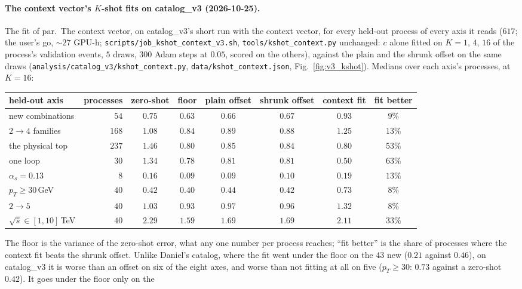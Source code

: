 \documentclass[11pt]{article}
\newcommand{\code}[1]{\texttt{#1}}
\begin{document}
\paragraph{The context vector's $K$-shot fits on catalog\_v3 (2026-10-25).} The fit of par.\ The context vector, on
catalog\_v3's short run with the context vector, for every held-out process of every axis it reads ($617$; the user's go,
$\sim27$ GPU-h; \code{scripts/job\_kshot\_context\_v3.sh}, \code{tools/kshot\_context.py} unchanged: $c$ alone fitted on
$K=1$, $4$, $16$ of the process's validation events, $5$ draws, $300$ Adam steps at $0.05$, scored on the others),
against the plain and the shrunk offset on the same draws (\code{analysis/catalog\_v3/kshot\_context.py},
\code{data/kshot\_context.json}, Fig.~\ref{fig:v3_kshot}). Medians over each axis's processes, at $K=16$:
\begin{center}
\small
\begin{tabular}{lrcccccc}
\hline
held-out axis & processes & zero-shot & floor & plain offset & shrunk offset & context fit & fit better \\
\hline
new combinations & $54$ & $0.75$ & $0.63$ & $0.66$ & $0.67$ & $0.93$ & $9\%$ \\
$2\to4$ families & $168$ & $1.08$ & $0.84$ & $0.89$ & $0.88$ & $1.25$ & $13\%$ \\
the physical top & $237$ & $1.46$ & $0.80$ & $0.85$ & $0.84$ & $0.80$ & $53\%$ \\
one loop & $30$ & $1.34$ & $0.78$ & $0.81$ & $0.81$ & $0.50$ & $63\%$ \\
$\alpha_s=0.13$ & $8$ & $0.16$ & $0.09$ & $0.09$ & $0.10$ & $0.19$ & $13\%$ \\
$p_T\geq30$\,GeV & $40$ & $0.42$ & $0.40$ & $0.44$ & $0.42$ & $0.73$ & $8\%$ \\
$2\to5$ & $40$ & $1.03$ & $0.93$ & $0.97$ & $0.96$ & $1.32$ & $8\%$ \\
$\sqrt{\hat s}\in[1,10]$\,TeV & $40$ & $2.29$ & $1.59$ & $1.69$ & $1.69$ & $2.11$ & $33\%$ \\
\hline
\end{tabular}
\end{center}
The floor is the variance of the zero-shot error, what any one number per process reaches; ``fit better'' is the share
of processes where the context fit beats the shrunk offset. Unlike Daniel's catalog, where the fit went under the floor
on the $43$ new ($0.21$ against $0.46$), on catalog\_v3 it is worse than an offset on six of the eight axes, and worse
than not fitting at all on five ($p_T\geq30$: $0.73$ against a zero-shot $0.42$). It goes under the floor only on the
\end{document}
